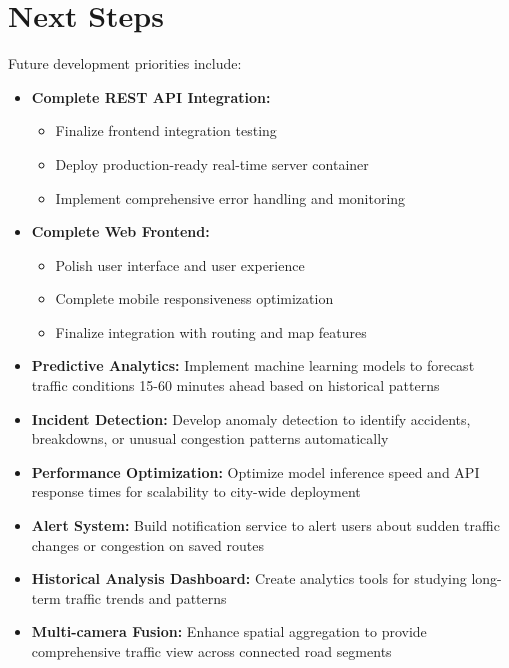 \section{Next Steps}

Future development priorities include:

\begin{itemize}
    \item \textbf{Complete REST API Integration:}
    \begin{itemize}
        \item Finalize frontend integration testing
        \item Deploy production-ready real-time server container
        \item Implement comprehensive error handling and monitoring
    \end{itemize}
    
    \item \textbf{Complete Web Frontend:}
    \begin{itemize}
        \item Polish user interface and user experience
        \item Complete mobile responsiveness optimization
        \item Finalize integration with routing and map features
    \end{itemize}
    
    \item \textbf{Predictive Analytics:} Implement machine learning models to forecast traffic conditions 15-60 minutes ahead based on historical patterns
    
    \item \textbf{Incident Detection:} Develop anomaly detection to identify accidents, breakdowns, or unusual congestion patterns automatically
    
    \item \textbf{Performance Optimization:} Optimize model inference speed and API response times for scalability to city-wide deployment
    
    \item \textbf{Alert System:} Build notification service to alert users about sudden traffic changes or congestion on saved routes
    
    \item \textbf{Historical Analysis Dashboard:} Create analytics tools for studying long-term traffic trends and patterns
    
    \item \textbf{Multi-camera Fusion:} Enhance spatial aggregation to provide comprehensive traffic view across connected road segments
\end{itemize}

